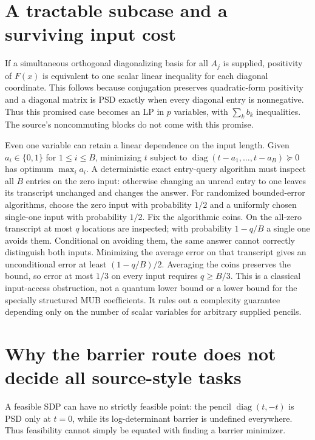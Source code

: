 \documentclass[11pt]{article}
\begin{document}
\section{A tractable subcase and a surviving input cost}
If a simultaneous orthogonal diagonalizing basis for all $A_j$
is supplied, positivity of $F(x)$ is equivalent to one scalar
linear inequality for each diagonal coordinate. This follows
because conjugation preserves quadratic-form positivity and a
diagonal matrix is PSD exactly when every diagonal entry is
nonnegative. Thus this promised case becomes an LP in $p$
variables, with $\sum_kb_k$ inequalities. The source's noncommuting
blocks do not come with this promise.

Even one variable can retain a linear dependence on the input
length. Given $a_i\in\{0,1\}$ for $1\le i\le B$, minimizing
$t$ subject to $\operatorname{diag}(t-a_1,\ldots,t-a_B)\succeq0$
has optimum $\max_i a_i$. A deterministic exact entry-query
algorithm must inspect all $B$ entries on the zero input:
otherwise changing an unread entry to one leaves its transcript
unchanged and changes the answer. For randomized bounded-error
algorithms, choose the zero input with probability $1/2$ and a
uniformly chosen single-one input with probability $1/2$.
Fix the algorithmic coins. On the all-zero transcript at most
$q$ locations are inspected; with probability $1-q/B$ a single
one avoids them. Conditional on avoiding them, the same answer
cannot correctly distinguish both inputs. Minimizing the average
error on that transcript gives an unconditional error at least
$(1-q/B)/2$. Averaging the coins preserves the bound, so error
at most $1/3$ on every input requires $q\ge B/3$.
This is a classical input-access obstruction, not a quantum
lower bound or a lower bound for the specially structured MUB
coefficients. It rules out a complexity guarantee depending only
on the number of scalar variables for arbitrary supplied pencils.

\section{Why the barrier route does not decide all source-style tasks}
A feasible SDP can have no strictly feasible point: the pencil
$\operatorname{diag}(t,-t)$ is PSD only at $t=0$, while its
log-determinant barrier is undefined everywhere. Thus feasibility
cannot simply be equated with finding a barrier minimizer.
\end{document}

